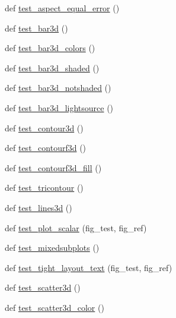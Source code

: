 \begin{DoxyCompactItemize}
\item 
def \hyperlink{namespacetests_1_1test__mplot3d_a01b073bf51bab652688dd1531111f38d}{test\+\_\+aspect\+\_\+equal\+\_\+error} ()
\item 
def \hyperlink{namespacetests_1_1test__mplot3d_ac8527a1333b11949404fae4f99fc3710}{test\+\_\+bar3d} ()
\item 
def \hyperlink{namespacetests_1_1test__mplot3d_a308ab6883bb3b65f841dc05f064eb698}{test\+\_\+bar3d\+\_\+colors} ()
\item 
def \hyperlink{namespacetests_1_1test__mplot3d_ae02843ca3e7f740a67b7bd08e051be92}{test\+\_\+bar3d\+\_\+shaded} ()
\item 
def \hyperlink{namespacetests_1_1test__mplot3d_a0676148724c80555200347d48f75495c}{test\+\_\+bar3d\+\_\+notshaded} ()
\item 
def \hyperlink{namespacetests_1_1test__mplot3d_ab1fbb4e574f766803adfbc2d5982c73f}{test\+\_\+bar3d\+\_\+lightsource} ()
\item 
def \hyperlink{namespacetests_1_1test__mplot3d_aae9f8ac036fb84940f2698fc8928f952}{test\+\_\+contour3d} ()
\item 
def \hyperlink{namespacetests_1_1test__mplot3d_ac0ca639823ec94c062be2edcac424066}{test\+\_\+contourf3d} ()
\item 
def \hyperlink{namespacetests_1_1test__mplot3d_a9816453fe7ddca330f196331b3bfd788}{test\+\_\+contourf3d\+\_\+fill} ()
\item 
def \hyperlink{namespacetests_1_1test__mplot3d_a23dec01609f1dd229d5f9080a04a363c}{test\+\_\+tricontour} ()
\item 
def \hyperlink{namespacetests_1_1test__mplot3d_af511f7cee4a4c20c27a9f4318f891dcf}{test\+\_\+lines3d} ()
\item 
def \hyperlink{namespacetests_1_1test__mplot3d_a5319671821149b65a1370b256fa605ab}{test\+\_\+plot\+\_\+scalar} (fig\+\_\+test, fig\+\_\+ref)
\item 
def \hyperlink{namespacetests_1_1test__mplot3d_a6c34fdd4c84f847b18673807a9269be3}{test\+\_\+mixedsubplots} ()
\item 
def \hyperlink{namespacetests_1_1test__mplot3d_a41c7863d0173173fafcaea044c52a9e4}{test\+\_\+tight\+\_\+layout\+\_\+text} (fig\+\_\+test, fig\+\_\+ref)
\item 
def \hyperlink{namespacetests_1_1test__mplot3d_a2d20b91931a03155aa6bb6720c913ea7}{test\+\_\+scatter3d} ()
\item 
def \hyperlink{namespacetests_1_1test__mplot3d_a777f3d8828a33b95d460ed3ebde0c3c9}{test\+\_\+scatter3d\+\_\+color} ()

\end{DoxyCompactItemize}
